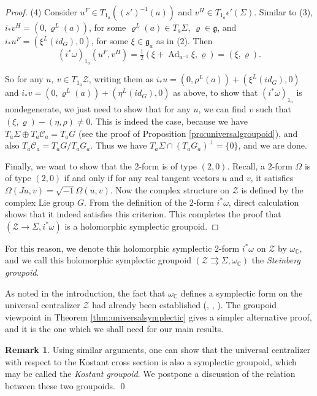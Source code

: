 \documentclass[a4paper,12pt,leqno]{amsart}
\numberwithin{equation}{section}
\theoremstyle{plain}
\theoremstyle{definition}
\DeclareMathOperator{\Ad}{Ad}
\newcommand{\cZ}{\mathcal{Z}}
\newcommand{\cC}{\mathcal{C}}
\newcommand{\bC}{\mathbb{C}}
\newcommand{\fg}{\mathfrak{g}}
\newtheorem{rem}[thm]{Remark}
\begin{document}
\begin{proof}
(4) Consider $u^F\in T_{1_a}((s')^{-1}(a))$ and $v^H\in T_{1_a}\epsilon'(\Sigma)$. Similar to (3), $i_*v^H=(0,\varrho^L(a))$, for some $\varrho^L(a)\in T_a\Sigma$, $ \varrho\in  \fg$, and $i_*u^F=(\xi^L(id_G),0)$, for some $\xi\in  \fg_a $ as in (2). Then
\[
(i^*\omega)_{1_a}(u^F,v^H)= \tfrac{1}{2} (\xi+\Ad_{a^{-1}}\xi, \varrho)=(\xi,\varrho).
\]

So for any $u,~v \in T_{1_a}\cZ$, writing them as $i_*u=(0,\rho^L(a))+(\xi^L(id_G),0)$ and $i_*v=(0,\varrho^L(a)) + (\eta^L(id_G),0)$ as above, to show that $(i^*\omega)_{1_a}$ is nondegenerate, we just need to show that for any $u$, we can find $v$ such that $(\xi,\varrho)-(\eta,\rho)\neq 0$. This is indeed the case, because we have $T_a \Sigma \oplus T_a \cC_a= T_aG$ (see the proof of Proposition \ref{pro:universalgroupoid}), and also $T_a \cC_a=T_a G/T_a G_a$. Thus we have $T_a \Sigma\cap (T_a G_a)^{\perp}=\{0\}$, and we are done.

Finally, we want to show that the 2-form is of type $(2,0)$. Recall, a $2$-form $\Omega$ is of type $(2,0)$ if and only if for any real tangent vectors $u$ and $v$, it satisfies $\Omega(Ju, v) = \sqrt{-1} \Omega(u, v)$. Now the complex structure on $\cZ$ is defined by the complex Lie group $G$. From the definition of the $2$-form $i^*\omega$, direct calculation shows that it indeed satisfies this criterion. This completes the proof that $(\cZ\rightarrow \Sigma,i^*\omega)$ is a holomorphic symplectic groupoid.
\end{proof}

For this reason, we denote this holomorphic symplectic $2$-form $i^*\omega$ on $\cZ$ by $\omega_{\bC}$,  and we 
call this holomorphic symplectic groupoid $(\cZ\rightrightarrows \Sigma,\omega_{\bC}) $ the {\em Steinberg groupoid}.

As noted in the introduction, the fact that $\omega_{\bC}$ defines a
symplectic form on the universal centralizer $\cZ$ had
already been established
(\cite{BFM}, \cite{FiTs19}, \cite{Ba22}). The groupoid viewpoint
in Theorem \ref{thm:universalsymplectic} gives a simpler
alternative proof, and it is the one which we shall need for
our main results.


\begin{rem}\label{remarkX.K}
Using similar arguments, one can show that the universal centralizer with respect to the Kostant cross section is also a symplectic groupoid, which may be called the {\em Kostant groupoid}. We postpone a discussion of the relation between these two groupoids.
\qed
\end{rem}
\end{document}
